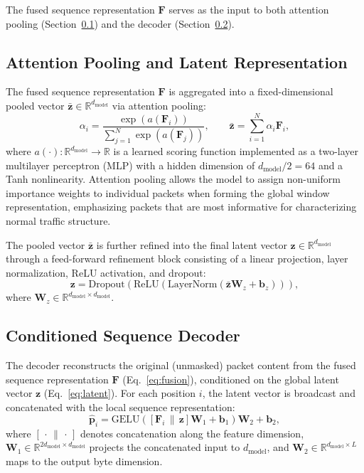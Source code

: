 The fused sequence representation $\mathbf{F}$ serves as the input to both attention pooling (Section~\ref{sec:pooling}) and the decoder (Section~\ref{sec:decoder}).

\subsection{Attention Pooling and Latent Representation}
\label{sec:pooling}
The fused sequence representation $\mathbf{F}$ is aggregated into a fixed-dimensional pooled vector $\bar{\mathbf{z}} \in \mathbb{R}^{d_{\text{model}}}$ via attention pooling:
\begin{equation}
    \alpha_i = \frac{\exp\!\left(a(\mathbf{F}_i)\right)}{\sum_{j=1}^{N} \exp\!\left(a(\mathbf{F}_j)\right)}, \qquad
    \bar{\mathbf{z}} = \sum_{i=1}^{N} \alpha_i \mathbf{F}_i,
    \label{eq:attnpool}
\end{equation}
where $a(\cdot): \mathbb{R}^{d_{\text{model}}} \rightarrow \mathbb{R}$ is a learned scoring function implemented as a two-layer multilayer perceptron (MLP) with a hidden dimension of $d_{\text{model}}/2 = 64$ and a Tanh nonlinearity. Attention pooling allows the model to assign non-uniform importance weights to individual packets when forming the global window representation, emphasizing packets that are most informative for characterizing normal traffic structure.

The pooled vector $\bar{\mathbf{z}}$ is further refined into the final latent vector $\mathbf{z} \in \mathbb{R}^{d_{\text{model}}}$ through a feed-forward refinement block consisting of a linear projection, layer normalization, ReLU activation, and dropout:
\begin{equation}
    \mathbf{z} = \text{Dropout}\!\left(\text{ReLU}\!\left(\text{LayerNorm}\!\left(\bar{\mathbf{z}}\mathbf{W}_z + \mathbf{b}_z\right)\right)\right),
    \label{eq:latent}
\end{equation}
where $\mathbf{W}_z \in \mathbb{R}^{d_{\text{model}} \times d_{\text{model}}}$.

\subsection{Conditioned Sequence Decoder}
\label{sec:decoder}
The decoder reconstructs the original (unmasked) packet content from the fused sequence representation $\mathbf{F}$ (Eq.~\eqref{eq:fusion}), conditioned on the global latent vector $\mathbf{z}$ (Eq.~\eqref{eq:latent}). For each position $i$, the latent vector is broadcast and concatenated with the local sequence representation:
\begin{equation}
    \hat{\mathbf{p}}_i = \text{GELU}\!\left(\left[\mathbf{F}_i \,\|\, \mathbf{z}\right] \mathbf{W}_1 + \mathbf{b}_1\right) \mathbf{W}_2 + \mathbf{b}_2,
    \label{eq:decoder}
\end{equation}
where $[\,\cdot\,\|\,\cdot\,]$ denotes concatenation along the feature dimension, $\mathbf{W}_1 \in \mathbb{R}^{2d_{\text{model}} \times d_{\text{model}}}$ projects the concatenated input to $d_{\text{model}}$, and $\mathbf{W}_2 \in \mathbb{R}^{d_{\text{model}} \times L}$ maps to the output byte dimension.

